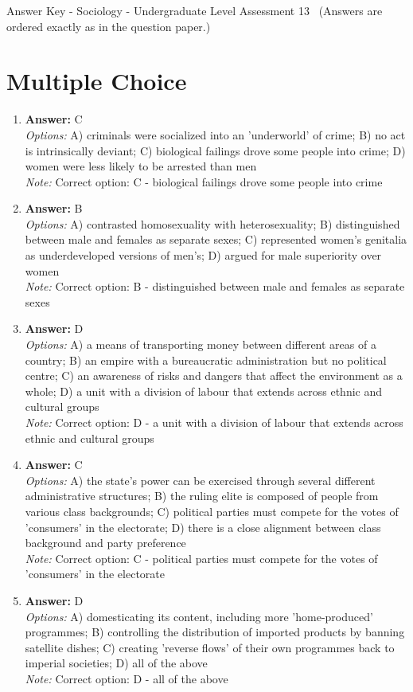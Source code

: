 \documentclass[12pt]{article}
\begin{document}
\begin{center}
Answer Key - Sociology - Undergraduate Level Assessment 13 \
\small (Answers are ordered exactly as in the question paper.)
\end{center}

\section*{Multiple Choice}
\begin{enumerate}[label=\arabic*.]
\item \textbf{Answer:} C
\\ \textit{Options:} A) criminals were socialized into an 'underworld' of crime; B) no act is intrinsically deviant; C) biological failings drove some people into crime; D) women were less likely to be arrested than men
\\ \textit{Note:} Correct option: C - biological failings drove some people into crime
\item \textbf{Answer:} B
\\ \textit{Options:} A) contrasted homosexuality with heterosexuality; B) distinguished between male and females as separate sexes; C) represented women's genitalia as underdeveloped versions of men's; D) argued for male superiority over women
\\ \textit{Note:} Correct option: B - distinguished between male and females as separate sexes
\item \textbf{Answer:} D
\\ \textit{Options:} A) a means of transporting money between different areas of a country; B) an empire with a bureaucratic administration but no political centre; C) an awareness of risks and dangers that affect the environment as a whole; D) a unit with a division of labour that extends across ethnic and cultural groups
\\ \textit{Note:} Correct option: D - a unit with a division of labour that extends across ethnic and cultural groups
\item \textbf{Answer:} C
\\ \textit{Options:} A) the state's power can be exercised through several different administrative structures; B) the ruling elite is composed of people from various class backgrounds; C) political parties must compete for the votes of 'consumers' in the electorate; D) there is a close alignment between class background and party preference
\\ \textit{Note:} Correct option: C - political parties must compete for the votes of 'consumers' in the electorate
\item \textbf{Answer:} D
\\ \textit{Options:} A) domesticating its content, including more 'home-produced' programmes; B) controlling the distribution of imported products by banning satellite dishes; C) creating 'reverse flows' of their own programmes back to imperial societies; D) all of the above
\\ \textit{Note:} Correct option: D - all of the above
\end{enumerate}
\end{document}
